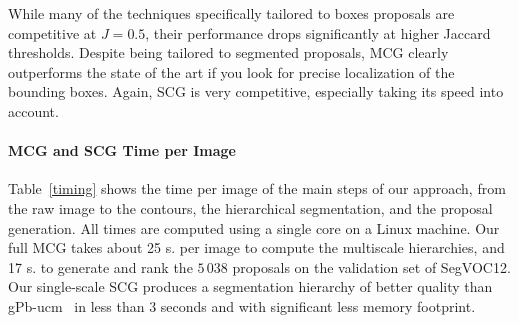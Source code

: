 \documentclass[10pt,journal,cspaper,compsoc]{IEEEtran}
\begin{document}
While many of the techniques specifically tailored to boxes proposals are competitive at $J\!=\!0.5$, their performance drops 
significantly at higher Jaccard thresholds.
Despite being tailored to segmented proposals, MCG clearly outperforms the state of the art if you look for
precise localization of the bounding boxes.
Again, SCG is very competitive, especially taking its speed into account.


\paragraph*{\textbf{MCG and SCG Time per Image}}
Table~\ref{timing} shows the time per image of the main steps of our approach,
from the raw image to the contours, the hierarchical segmentation, and the proposal generation.
All times are computed using a single core on a Linux machine.
Our full MCG takes about 25 s. per image to compute the multiscale hierarchies, and 17 s. to generate and
rank the $5\,038$ proposals on the validation set of SegVOC12.
Our single-scale SCG produces a segmentation hierarchy of better quality than gPb-ucm~\cite{Arbelaez2011} in less than 3
seconds and with significant less memory footprint.
\end{document}
